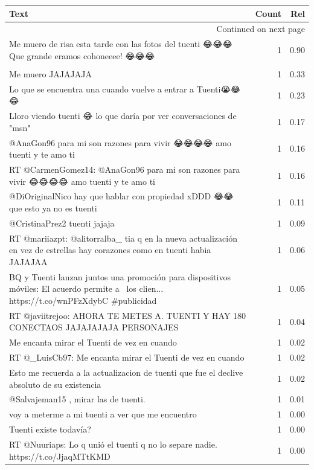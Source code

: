 \begin{longtable}{p{12.5cm}rr}
\toprule
Text & Count & Rel \\
\midrule
\endhead
\midrule
\multicolumn{3}{r}{{Continued on next page}} \\
\midrule
\endfoot

\bottomrule
\endlastfoot
Me muero de risa esta tarde con las fotos del tuenti 😂😂😂 Que grande eramos cohoneeee! 😂😂😂 & 1 & 0.90 \\
\begin{tabular}[c]{@{}l@{}}Acabo de ver una tienda y en el escaparate ponía: "siguenos en tuenti."  \\ Me muero JAJAJAJA\end{tabular} & 1 & 0.33 \\
Lo que se encuentra una cuando vuelve a entrar a Tuenti😭😂😂 & 1 & 0.23 \\
Lloro viendo tuenti 😂 lo que daría por ver conversaciones de "msn" & 1 & 0.17 \\
@AnaGon96 para mi son razones para vivir 😂😂😂😂 amo tuenti y te amo ti 💞 & 1 & 0.16 \\
RT @CarmenGomez14: @AnaGon96 para mi son razones para vivir 😂😂😂😂 amo tuenti y te amo ti 💞 & 1 & 0.16 \\
@DiOriginalNico hay que hablar con propiedad xDDD 😂😂 que esto ya no es tuenti & 1 & 0.11 \\
@CristinaPrez2 tuenti jajaja & 1 & 0.09 \\
RT @mariiazpt: @alitorralba\_ tia q en la nueva actualización en vez de estrellas hay corazones como en tuenti habia JAJAJAA & 1 & 0.06 \\
BQ y Tuenti lanzan juntos una promoción para dispositivos móviles: El acuerdo permite a  los clien... https://t.co/wnPFzXdybC \#publicidad & 1 & 0.05 \\
RT @javiitrejoo: AHORA TE METES A. TUENTI Y HAY 180 CONECTAOS JAJAJAJAJA PERSONAJES & 1 & 0.04 \\
Me encanta mirar el Tuenti de vez en cuando & 1 & 0.02 \\
RT @\_LuisCb97: Me encanta mirar el Tuenti de vez en cuando & 1 & 0.02 \\
Esto me recuerda a la actualizacion de tuenti que fue el declive absoluto de su existencia & 1 & 0.02 \\
@Salvajeman15 , mirar las de tuenti. & 1 & 0.01 \\
voy a meterme a mi tuenti a ver que me encuentro & 1 & 0.00 \\
Tuenti existe todavía? & 1 & 0.00 \\
RT @Nuuriaps: Lo q unió el tuenti q no lo separe nadie.👫 https://t.co/JjaqMTtKMD & 1 & 0.00 \\

\end{longtable}

